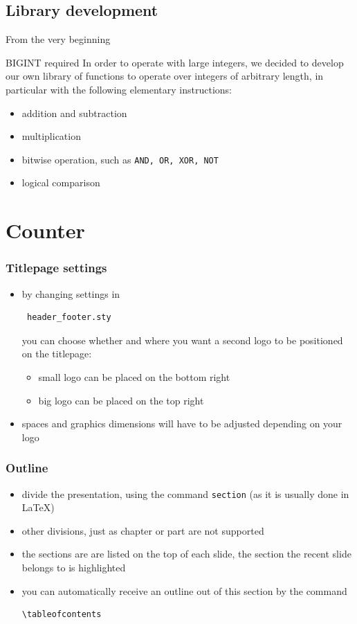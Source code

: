 \documentclass{beamer}
\begin{document}
\subsection{Library development}
\begin{frame}{From the very beginning}
	\begin{block}{BIGINT required}
		In order to operate with large integers, we decided to develop our own library of functions to operate over integers of arbitrary length, in particular with the following elementary instructions:
		\begin{itemize}
			\item addition and subtraction
			\item multiplication
			\item bitwise operation, such as \texttt{AND, OR, XOR, NOT}
			\item logical comparison
		\end{itemize}
	\end{block}
\end{frame}




\section{Counter}

\begin{frame}[fragile]
\frametitle{Titlepage settings}
\begin{itemize}
\item by changing settings in \begin{verbatim} header_footer.sty \end{verbatim} you can choose whether and where you want a second logo to be positioned on the titlepage:
\begin{itemize}
\item small logo can be placed on the bottom right
\item big logo can be placed on the top right
\end{itemize}
\item spaces and graphics dimensions will have to be adjusted depending on your logo
\end{itemize}
\end{frame}

\begin{frame}[fragile]
\frametitle{Outline}
\begin{itemize}
\item divide the presentation, using the command {\tt section} 
(as it is usually done in \LaTeX) 
\item other divisions, just as chapter or part are not supported
\item the sections are are listed on the top of each slide, the section the 
recent slide belongs to is highlighted
\item you can automatically receive an outline out of this section by the command
\begin{verbatim}
\tableofcontents
\end{verbatim}
\end{itemize}
\end{frame}
\end{document}
